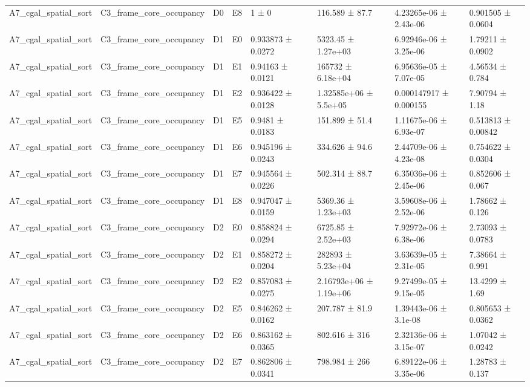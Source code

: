 \begin{table}
\begin{tabular}{lllllllll}
A7\_cgal\_spatial\_sort & C3\_frame\_core\_occupancy & D0 & E8 & 1 ± 0 &  & 116.589 ± 87.7 & 4.23265e-06 ± 2.43e-06 & 0.901505 ± 0.0604 \\
A7\_cgal\_spatial\_sort & C3\_frame\_core\_occupancy & D1 & E0 & 0.933873 ± 0.0272 &  & 5323.45 ± 1.27e+03 & 6.92946e-06 ± 3.25e-06 & 1.79211 ± 0.0902 \\
A7\_cgal\_spatial\_sort & C3\_frame\_core\_occupancy & D1 & E1 & 0.94163 ± 0.0121 &  & 165732 ± 6.18e+04 & 6.95636e-05 ± 7.07e-05 & 4.56534 ± 0.784 \\
A7\_cgal\_spatial\_sort & C3\_frame\_core\_occupancy & D1 & E2 & 0.936422 ± 0.0128 &  & 1.32585e+06 ± 5.5e+05 & 0.000147917 ± 0.000155 & 7.90794 ± 1.18 \\
A7\_cgal\_spatial\_sort & C3\_frame\_core\_occupancy & D1 & E5 & 0.9481 ± 0.0183 &  & 151.899 ± 51.4 & 1.11675e-06 ± 6.93e-07 & 0.513813 ± 0.00842 \\
A7\_cgal\_spatial\_sort & C3\_frame\_core\_occupancy & D1 & E6 & 0.945196 ± 0.0243 &  & 334.626 ± 94.6 & 2.44709e-06 ± 4.23e-08 & 0.754622 ± 0.0304 \\
A7\_cgal\_spatial\_sort & C3\_frame\_core\_occupancy & D1 & E7 & 0.945564 ± 0.0226 &  & 502.314 ± 88.7 & 6.35036e-06 ± 2.45e-06 & 0.852606 ± 0.067 \\
A7\_cgal\_spatial\_sort & C3\_frame\_core\_occupancy & D1 & E8 & 0.947047 ± 0.0159 &  & 5369.36 ± 1.23e+03 & 3.59608e-06 ± 2.52e-06 & 1.78662 ± 0.126 \\
A7\_cgal\_spatial\_sort & C3\_frame\_core\_occupancy & D2 & E0 & 0.858824 ± 0.0294 &  & 6725.85 ± 2.52e+03 & 7.92972e-06 ± 6.38e-06 & 2.73093 ± 0.0783 \\
A7\_cgal\_spatial\_sort & C3\_frame\_core\_occupancy & D2 & E1 & 0.858272 ± 0.0204 &  & 282893 ± 5.23e+04 & 3.63639e-05 ± 2.31e-05 & 7.38664 ± 0.991 \\
A7\_cgal\_spatial\_sort & C3\_frame\_core\_occupancy & D2 & E2 & 0.857083 ± 0.0275 &  & 2.16793e+06 ± 1.19e+06 & 9.27499e-05 ± 9.15e-05 & 13.4299 ± 1.69 \\
A7\_cgal\_spatial\_sort & C3\_frame\_core\_occupancy & D2 & E5 & 0.846262 ± 0.0162 &  & 207.787 ± 81.9 & 1.39443e-06 ± 3.1e-08 & 0.805653 ± 0.0362 \\
A7\_cgal\_spatial\_sort & C3\_frame\_core\_occupancy & D2 & E6 & 0.863162 ± 0.0365 &  & 802.616 ± 316 & 2.32136e-06 ± 3.15e-07 & 1.07042 ± 0.0242 \\
A7\_cgal\_spatial\_sort & C3\_frame\_core\_occupancy & D2 & E7 & 0.862806 ± 0.0341 &  & 798.984 ± 266 & 6.89122e-06 ± 3.35e-06 & 1.28783 ± 0.137 \\

\end{tabular}
\end{table}
